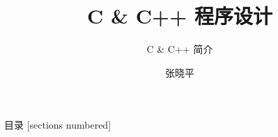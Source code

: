 \documentclass[10pt]{beamer}
\title{C \& C++ 程序设计}
\subtitle{C \& C++ 简介}
\date{}%
\author{张晓平}
\institute{数学与统计学院}
\newcommand\Fontvi{\fontsize{6.5}{7.2}\selectfont}
\begin{document}
\maketitle

\begin{frame}{目录}  
  [sections numbered]
  \tableofcontents[hideallsubsections]
\end{frame}

% 
% 
% 
% 
% 
% 
% 

\end{document}
